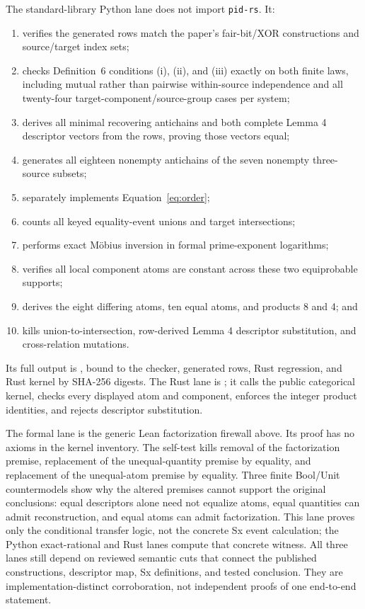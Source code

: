 \documentclass[11pt]{article}
\begin{document}
The standard-library Python lane
\newline
\mbox{}
does not import \texttt{pid-rs}.  It:
\begin{enumerate}
  \item verifies the generated rows match the paper's fair-bit/XOR
        constructions and source/target index sets;
  \item checks Definition~6 conditions (i), (ii), and (iii) exactly on both
        finite laws, including
        mutual rather than pairwise within-source independence and all
        twenty-four target-component/source-group cases per system;
  \item derives all minimal recovering antichains and both complete Lemma 4
        descriptor vectors from the rows, proving those vectors equal;
  \item generates all eighteen nonempty antichains of the seven nonempty
        three-source subsets;
  \item separately implements Equation~\eqref{eq:order};
  \item counts all keyed equality-event unions and target intersections;
  \item performs exact M\"obius inversion in formal prime-exponent logarithms;
  \item verifies all local component atoms are constant across these two
        equiprobable supports;
  \item derives the eight differing atoms, ten equal atoms, and products 8 and
        4; and
  \item kills union-to-intersection, row-derived Lemma 4 descriptor substitution,
        and cross-relation mutations.
\end{enumerate}
Its full output is
, bound to the
checker, generated rows, Rust regression, and Rust kernel by SHA-256 digests.
The Rust lane is
; it calls the public
categorical kernel, checks every displayed atom and component, enforces the
integer product identities, and rejects descriptor substitution.

The formal lane is the generic Lean factorization firewall above.  Its proof
has no axioms in the kernel inventory.  The self-test kills removal of the
factorization premise, replacement of the unequal-quantity premise by
equality, and replacement of the unequal-atom premise by equality.  Three
finite Bool/Unit countermodels show why the altered premises cannot support the
original conclusions: equal descriptors alone need not equalize atoms, equal
quantities can admit reconstruction, and equal atoms can admit factorization.
This lane proves only the conditional transfer logic, not the concrete Sx
event calculation; the Python exact-rational and Rust lanes compute that
concrete witness.  All three lanes still depend on reviewed semantic cuts that
connect the published constructions, descriptor map, Sx definitions, and
tested conclusion.  They are implementation-distinct corroboration, not
independent proofs of one end-to-end statement.
\end{document}
